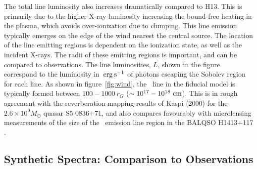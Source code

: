 \documentclass[useAMS,usenatbib]{mn2e_x}
\begin{document}
The total line luminosity also increases dramatically compared to H13. 
This is primarily due to the higher X-ray luminosity increasing the bound-free
heating in the plasma, which avoids over-ionization due to clumping.
This line emission typically emerges on the edge of the wind
nearest the central source. The location of the line emitting regions
is dependent on the ionization state, as well as the incident X-rays.
The radii of these emitting regions is important,
and can be compared to observations. The line luminosities, $L$,
shown in the figure correspond to the luminosity in $\:{\rm erg\:s^{-1}}$ of photons
escaping the Sobolev region for each line. 
As shown in figure~\ref{fig:wind},
the \civline\ line in the fiducial model is typically formed between 
$100-1000~r_G$ ($\sim10^{17}-10^{18}~\rm{cm}$).
This is in rough agreement with the reverberation mapping 
results of Kaspi (2000) for the $2.6\times10^{9} M_\odot$ quasar S5 0836+71,
and also compares favourably with microlensing measurements of the size of the
\civline\ emission line region in the BALQSO H1413+117 \citep{odowd2015}.


\subsection{Synthetic Spectra: Comparison to Observations}
\end{document}

